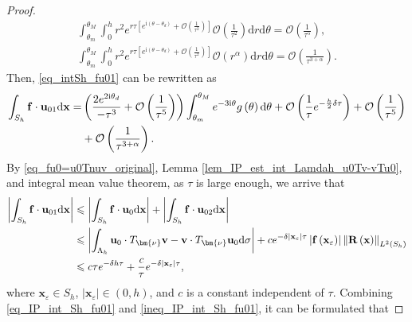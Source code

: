 \documentclass[11pt,reqno,oneside]{amsart}
\theoremstyle{definition}
\theoremstyle{remark}
\numberwithin{equation}{section}
\numberwithin{equation}{section}
\theoremstyle{remark}
\begin{document}
\begin{proof}
\begin{align*}
		\int_{\theta_m}^{\theta_M} \int_{0}^{h} r^2 e^{r \tau\left[e^{\mathrm{i}\left(\theta-\theta_d\right)} + \mathcal{O}\left(\frac{1}{\tau^2}\right)\right]} \mathcal{O}\left(\frac{1}{\tau^2}\right) \mathrm{d}r \mathrm{d}\theta = \mathcal{O} \left(\frac{1}{\tau^5}\right) ,\\
		\int_{\theta_m}^{\theta_M} \int_{0}^{h} r^2 e^{r \tau\left[e^{\mathrm{i}\left(\theta-\theta_d\right)} + \mathcal{O}\left(\frac{1}{\tau^2}\right)\right]} \mathcal{O}\left(r^{\alpha}\right) \mathrm{d}r \mathrm{d}\theta = \mathcal{O} \left(\frac{1}{\tau^{3+\alpha}}\right) .
	\end{align*}
	Then, \eqref{eq_intSh_fu01} can be rewritten as
	\begin{align} \label{eq_IP_int_Sh_fu01}
		\int_{S_h} \mathbf{f} \cdot \mathbf{u}_{01} \mathrm{d}\mathbf{x} = & \left(\frac{2e^{2\text{i}\theta_d}}{-\tau^3} + \mathcal{O} \left(\frac{1}{\tau^5}\right)\right)  \int_{\theta_m}^{\theta_M} e^{-3\text{i}\theta} g\left(\theta\right) \mathrm{d}\theta + \mathcal{O} \left( \frac{1}{\tau} e^{-\frac{h}{2}\delta\tau} \right) + \mathcal{O} \left(\frac{1}{\tau^5}\right)\notag \\
		&  + \mathcal{O} \left(\frac{1}{\tau^{3+\alpha}}\right) .
	\end{align}
	By \eqref{eq_fu0=u0Tnuv_original}, Lemma \ref{lem_IP_est_int_Lamdah_u0Tv-vTu0}, and integral mean value theorem, as $ \tau $ is large enough, we arrive that
	\begin{align} \label{ineq_IP_int_Sh_fu01}
		\left|\int_{S_h} \mathbf{f} \cdot \mathbf{u}_{01} \mathrm{d}\mathbf{x}\right| & \leqslant \left|\int_{S_h} \mathbf{f} \cdot \mathbf{u}_{0} \mathrm{d}\mathbf{x}\right| + \left|\int_{S_h} \mathbf{f} \cdot \mathbf{u}_{02} \mathrm{d}\mathbf{x}\right| \notag \\
		& \leqslant \left|\int_{\Lambda_h} \mathbf{u}_0 \cdot T_{\bm{\nu}} \mathbf{v} - \mathbf{v} \cdot T_{\bm{\nu}} \mathbf{u}_0 \mathrm{d}\sigma\right| + ce^{-\delta\left|\mathbf{x}_{\varepsilon}\right|\tau} \left|\mathbf{f}\left(\mathbf{x}_{\varepsilon}\right)\right| \left\|\mathbf{R}\left(\mathbf{x}\right)\right\|_{L^2\left(S_h\right)} \notag \\
		& \leqslant c\tau e^{- \delta h \tau} +  \frac{c}{\tau}e^{-\delta\left|\mathbf{x}_{\varepsilon}\right|\tau} ,
	\end{align}
	where $ \mathbf{x}_{\varepsilon} \in S_h $, $ \left|\mathbf{x}_{\varepsilon}\right|\in\left(0,h\right) $, and $ c $ is a constant independent of $ \tau $. Combining \eqref{eq_IP_int_Sh_fu01} and \eqref{ineq_IP_int_Sh_fu01}, it can be formulated that

\end{proof}
\end{document}
